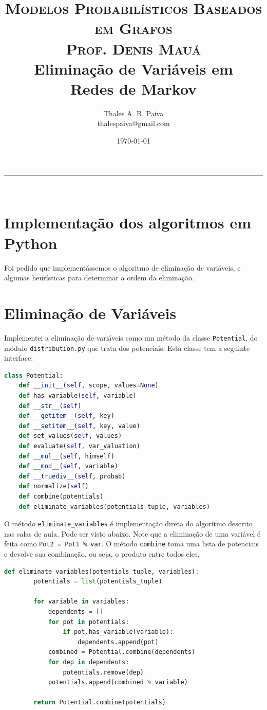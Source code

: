 \documentclass[paper=a4, fontsize=11pt]{scrartcl} %
\title{	
\normalfont \normalsize 
\textsc{Modelos Probabilísticos Baseados em Grafos} \\ 
\textsc{Prof. Denis Mauá} \\ [25pt]
\huge Eliminação de Variáveis em \\ Redes de Markov \\ [25pt]
}
\author{Thales A. B. Paiva \\ thalespaiva@gmail.com} %
\date{\today} %
\numberwithin{equation}{subsection}
\numberwithin{figure}{subsection}
\numberwithin{table}{subsection}
\numberwithin{definition}{subsection}
\numberwithin{theorem}{subsection}
\numberwithin{property}{subsection}
\numberwithin{proposition}{subsection}
\numberwithin{equation}{section}
\numberwithin{figure}{section}
\numberwithin{table}{section}
\numberwithin{definition}{section}
\numberwithin{theorem}{section}
\numberwithin{property}{section}
\numberwithin{proposition}{section}
\newcommand{\horrule}[1]{\rule{\linewidth}{#1}} %
\begin{document}
\maketitle %
\horrule{1pt} \\[0.5cm] %

\tableofcontents

\pagebreak
\section{Implementação dos algoritmos em Python}

Foi pedido que implementássemos o algoritmo de eliminação de variáveis, e algumas heurísticas para determinar a ordem da eliminação. 

\section{Eliminação de Variáveis}

Implementei a eliminação de variáveis como um método da classe \verb|Potential|, do módulo \verb|distribution.py| que trata dos potenciais. Esta classe tem a seguinte interface:

\begin{lstlisting}[language=python]
class Potential:
    def __init__(self, scope, values=None)
    def has_variable(self, variable)
    def __str__(self)
    def __getitem__(self, key)
    def __setitem__(self, key, value)
    def set_values(self, values)
    def evaluate(self, var_valuation)
    def __mul__(self, himself)
    def __mod__(self, variable)
    def __truediv__(self, probab)
    def normalize(self)
    def combine(potentials)
    def eliminate_variables(potentials_tuple, variables)
\end{lstlisting}


O método \verb|eliminate_variables| é implementação direta do algoritmo descrito nas salas de aula. Pode ser visto abaixo. Note que a eliminação de uma variável é feita como \verb|Pot2 = Pot1 % var|. O método \verb|combine| toma uma lista de potenciais e devolve sua combinação, ou seja, o produto entre todos eles.

\begin{lstlisting}[language=python]
    def eliminate_variables(potentials_tuple, variables):
        potentials = list(potentials_tuple)

        for variable in variables:
            dependents = []
            for pot in potentials:
                if pot.has_variable(variable):
                    dependents.append(pot)
            combined = Potential.combine(dependents)
            for dep in dependents:
                potentials.remove(dep)
            potentials.append(combined % variable)

        return Potential.combine(potentials)
\end{lstlisting}
\end{document}
